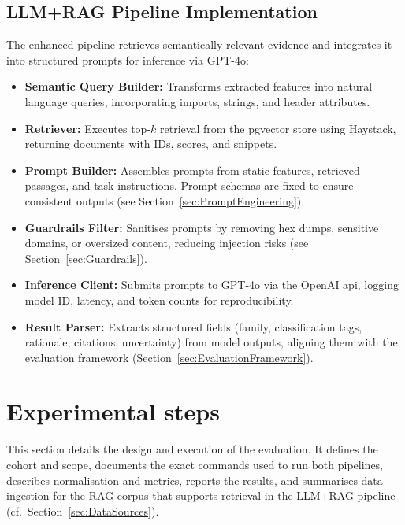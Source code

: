 \subsection{LLM+RAG Pipeline Implementation}\label{subsec:RAGImplementation}
The enhanced pipeline retrieves semantically relevant evidence and integrates it into structured
prompts for inference via GPT-4o:

\begin{itemize}
      \item \textbf{Semantic Query Builder:} Transforms extracted features into
            natural language queries, incorporating imports, strings, and header attributes.

      \item \textbf{Retriever:} Executes top-$k$ retrieval from the \gls{pgvector}
            store using Haystack, returning documents with IDs, scores, and snippets.

      \item \textbf{Prompt Builder:} Assembles prompts from static features,
            retrieved passages, and task instructions. Prompt schemas are fixed
            to ensure consistent outputs (see Section~\ref{sec:PromptEngineering}).

      \item \textbf{Guardrails Filter:} Sanitises prompts by removing hex dumps,
            sensitive domains, or oversized content, reducing injection risks
            (see Section~\ref{sec:Guardrails}).

      \item \textbf{Inference Client:} Submits prompts to GPT-4o via the OpenAI \gls{api},
            logging model ID, latency, and token counts for reproducibility.

      \item \textbf{Result Parser:} Extracts structured fields (family, classification tags,
            rationale, citations, uncertainty) from model outputs, aligning them with the
            evaluation framework (Section~\ref{sec:EvaluationFramework}).
\end{itemize}

\section{Experimental steps}\label{sec:ExperimentalSteps}
This section details the design and execution of the evaluation. It defines the cohort and scope,
documents the exact commands used to run both pipelines, describes normalisation and metrics,
reports the results, and summarises data ingestion for the RAG corpus that supports retrieval in
the LLM+RAG pipeline (cf.\ Section~\ref{sec:DataSources}).

